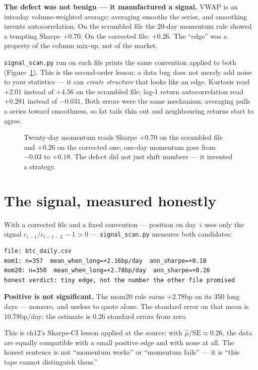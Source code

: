 \begin{example}\label{ex:manufactured}
\textbf{The defect was not benign --- it manufactured a signal.}
VWAP is an intraday volume-weighted average; averaging smooths
the series, and smoothing invents autocorrelation. On the
scrambled file the 20-day momentum rule showed a tempting
Sharpe $+0.70$. On the corrected file: $+0.26$. The ``edge''
was a property of the column mix-up, not of the market.
\begin{solution}
\texttt{signal\_scan.py} run on each file prints the same
convention applied to both (Figure~\ref{fig:signal}). This is
the second-order lesson: a data bug does not merely add noise
to your statistics --- it can \emph{create structure} that looks
like an edge. Kurtosis read $+2.01$ instead of $+4.56$ on the
scrambled file; lag-1 return autocorrelation read $+0.281$
instead of $-0.031$. Both errors were the same mechanism:
averaging pulls a series toward smoothness, so fat tails thin
out and neighbouring returns start to agree.
\end{solution}
\end{example}

\begin{figure}[htbp]\centering

\caption{Twenty-day momentum reads Sharpe $+0.70$ on the
scrambled file and $+0.26$ on the corrected one; one-day
momentum goes from $-0.03$ to $+0.18$. The defect did not just
shift numbers --- it invented a strategy.}
\label{fig:signal}
\end{figure}

\section{The signal, measured honestly}\label{sec:signal}

With a corrected file and a fixed convention --- position on
day~$i$ uses only the signal $c_{i-1}/c_{i-1-L}-1>0$ ---
\texttt{signal\_scan.py} measures both candidates:
\begin{verbatim}
file: btc_daily.csv
mom1: n=357  mean_when_long=+2.16bp/day  ann_sharpe=+0.18
mom20: n=350  mean_when_long=+2.78bp/day  ann_sharpe=+0.26
honest verdict: tiny edge, not the number the other file promised
\end{verbatim}

\begin{example}\label{ex:signal17}
\textbf{Positive is not significant.} The mom20 rule earns
$+2.78$bp on its 350 long days --- nonzero, and useless to
quote alone. The standard error on that mean is $10.78$bp/day:
the estimate is $0.26$ standard errors from zero.
\begin{solution}
This is ch12's Sharpe-CI lesson applied at the source: with
$\hat\mu/\mathrm{SE}\approx 0.26$, the data are equally
compatible with a small positive edge and with none at all. The
honest sentence is not ``momentum works'' or ``momentum fails''
--- it is ``this tape cannot distinguish them.''
\end{solution}
\end{example}

